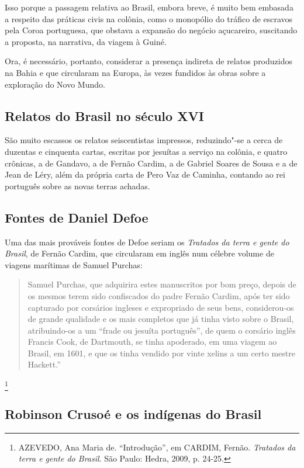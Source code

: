 \documentclass[12pt]{extarticle}
\begin{document}
Isso porque a passagem relativa ao Brasil, embora breve, é muito bem
embasada a respeito das práticas civis na colônia, como o monopólio do
tráfico de escravos pela Coroa portuguesa, que obstava a expansão do
negócio açucareiro, suscitando a proposta, na narrativa, da viagem à
Guiné.

Ora, é necessário, portanto, considerar a presença indireta de relatos
produzidos na Bahia e que circularam na Europa, às vezes fundidos às
obras sobre a exploração do Novo Mundo.

\subsection{Relatos do Brasil no século XVI}

São muito escassos os relatos seiscentistas impressos, reduzindo"-se a
cerca de duzentas e cinquenta cartas, escritas por jesuítas a serviço na
colônia, e quatro crônicas, a de Gandavo, a de Fernão Cardim, a de
Gabriel Soares de Sousa e a de Jean de Léry, além da própria carta de
Pero Vaz de Caminha, contando ao rei português sobre as novas terras
achadas.

\subsection{Fontes de Daniel Defoe}

Uma das mais prováveis fontes de Defoe seriam os \emph{Tratados da terra
e gente do Brasil}, de Fernão Cardim, que circularam em inglês num
célebre volume de viagens marítimas de Samuel Purchas:

\begin{quote} Samuel Purchas, que adquirira estes manuscritos por bom preço, depois
de os mesmos terem sido confiscados do padre Fernão Cardim, após ter
sido capturado por corsários ingleses e expropriado de seus bens,
considerou-os de grande qualidade e os mais completos que já tinha visto
sobre o Brasil, atribuindo-os a um ``frade ou jesuíta português'', de
quem o corsário inglês Francis Cook, de Dartmouth, se tinha apoderado,
em uma viagem ao Brasil, em 1601, e que os tinha vendido por vinte
xelins a um certo mestre Hackett.''\end{quote}\footnote{AZEVEDO, Ana Maria de.
  ``Introdução'', em CARDIM, Fernão. \emph{Tratados da terra e gente do
  Brasil}. São Paulo: Hedra, 2009, p. 24-25.}

\subsection{Robinson Crusoé e os indígenas do Brasil}
\end{document}
